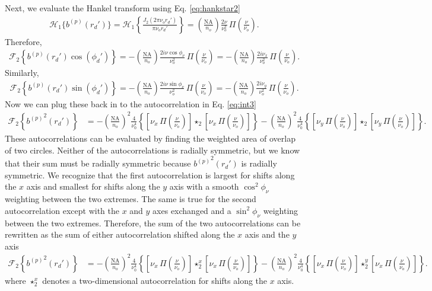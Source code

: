 \documentclass[11pt]{article}
\begin{document}
Next, we evaluate the Hankel transform using Eq. \ref{eq:hankstar2}
\begin{align}
  \mathcal{H}_{1}\{{b^{(p)}}(r_d')\} = \mathcal{H}_{1}\left\{\frac{J_{2}(2\pi \nu_or_d')}{\pi\nu_o r_d'}\right\} =
  \left(\frac{\text{NA}}{n_o}\right)\frac{2\nu}{\nu_o^{2}}\, \Pi\left(\frac{\nu}{\nu_o}\right).
\end{align}
Therefore, 
\begin{align}
  \mathcal{F}_2\left\{{b^{(p)}}(r_d')\cos(\phi_d')\right\} = -\left(\frac{\text{NA}}{n_o}\right)\frac{2i\nu\cos\phi_\nu}{\nu_o^2}\, \Pi\left(\frac{\nu}{\nu_o}\right) = -\left(\frac{\text{NA}}{n_o}\right)\frac{2i\nu_x}{\nu_o^2}\, \Pi\left(\frac{\nu}{\nu_o}\right).
\end{align}
Similarly,
\begin{align}
  \mathcal{F}_2\left\{{b^{(p)}}(r_d')\sin(\phi_d')\right\} = -\left(\frac{\text{NA}}{n_o}\right)\frac{2i\nu\sin\phi_\nu}{\nu_o^2}\, \Pi\left(\frac{\nu}{\nu_o}\right) = -\left(\frac{\text{NA}}{n_o}\right)\frac{2i\nu_y}{\nu_o^2}\, \Pi\left(\frac{\nu}{\nu_o}\right).  
\end{align}
Now we can plug these back in to the autocorrelation in Eq. \ref{eq:int3}
\begin{align}
    \mathcal{F}_2\left\{{b^{(p)}}^2(r_d')\right\} &= -\left(\frac{\text{NA}}{n_o}\right)^2\frac{4}{\nu_0^4}\left\{\left[\nu_x\, \Pi\left(\frac{\nu}{\nu_o}\right)\right] \star_2 \left[\nu_x\, \Pi\left(\frac{\nu}{\nu_o}\right)\right]\right\} - \left(\frac{\text{NA}}{n_o}\right)^2\frac{4}{\nu_0^4}\left\{\left[\nu_y\, \Pi\left(\frac{\nu}{\nu_o}\right)\right] \star_2 \left[\nu_y\, \Pi\left(\frac{\nu}{\nu_o}\right)\right]\right\}.\label{eq:auto}
\end{align}
These autocorrelations can be evaluated by finding the weighted area of overlap
of two circles. Neither of the autocorrelations is radially symmetric, but we
know that their sum must be radially symmetric because ${b^{(p)}}^2(r_d')$ is
radially symmetric. We recognize that the first autocorrelation is largest for
shifts along the $x$ axis and smallest for shifts along the $y$ axis with a
smooth $\cos^2\phi_\nu$ weighting between the two extremes. The same is true for
the second autocorrelation except with the $x$ and $y$ axes exchanged and a
$\sin^2\phi_\nu$ weighting between the two extremes. Therefore, the sum of the two
autocorrelations can be rewritten as the sum of either autocorrelation shifted along
the $x$ axis and the $y$ axis
\begin{align}
    \mathcal{F}_2\left\{{b^{(p)}}^2(r_d')\right\} &= -\left(\frac{\text{NA}}{n_o}\right)^2\frac{4}{\nu_0^4}\left\{\left[\nu_x\, \Pi\left(\frac{\nu}{\nu_o}\right)\right] \star_2^x \left[\nu_x\, \Pi\left(\frac{\nu}{\nu_o}\right)\right]\right\} - \left(\frac{\text{NA}}{n_o}\right)^2\frac{4}{\nu_0^4}\left\{\left[\nu_x\, \Pi\left(\frac{\nu}{\nu_o}\right)\right] \star_2^y \left[\nu_x\, \Pi\left(\frac{\nu}{\nu_o}\right)\right]\right\}.
\end{align}
where $\star_2^x$ denotes a two-dimensional autocorrelation for shifts along the
$x$ axis.
\end{document}
